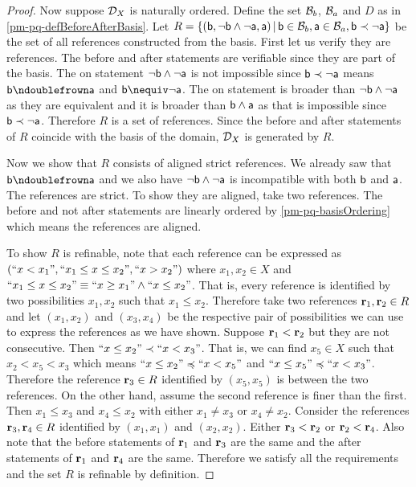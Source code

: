 \begin{mathSection}
\begin{proof}
		Now suppose $\edomain_X$ is naturally ordered. Define the set $\basis_b$, $\basis_a$ and $D$ as in \ref{pm-pq-defBeforeAfterBasis}. Let $R = \{ (\stmt[b], \NOT \stmt[b] \AND \NOT \stmt[a], \stmt[a]) \, | \, \stmt[b] \in \basis_b, \stmt[a] \in \basis_a, \stmt[b] \snarrower \NOT \stmt[a] \}$ be the set of all references constructed from the basis. First let us verify they are references. The before and after statements are verifiable since they are part of the basis. The on statement $\NOT \stmt[b] \AND \NOT \stmt[a]$ is not impossible since $\stmt[b] \snarrower \NOT \stmt[a]$ means $\stmt[b] \ncomp \stmt[a]$ and $\stmt[b] \nequiv \NOT \stmt[a]$. The on statement is broader than $\NOT \stmt[b] \AND \NOT \stmt[a]$ as they are equivalent and it is broader than $\stmt[b] \AND \stmt[a]$ as that is impossible since $\stmt[b] \snarrower \NOT \stmt[a]$. Therefore $R$ is a set of references. Since the before and after statements of $R$ coincide with the basis of the domain, $\edomain_X$ is generated by $R$.
		
		Now we show that $R$ consists of aligned strict references. We already saw that $\stmt[b] \ncomp \stmt[a]$ and we also have $\NOT \stmt[b] \AND \NOT \stmt[a]$ is incompatible with both $\stmt[b]$ and $\stmt[a]$. The references are strict. To show they are aligned, take two references. The before and not after statements are linearly ordered by \ref{pm-pq-basisOrdering} which means the references are aligned.
		
		To show $R$ is refinable, note that each reference can be expressed as $(``x < x_1", ``x_1 \leq x \leq x_2", ``x > x_2")$ where $x_1, x_2 \in X$ and $``x_1 \leq x \leq x_2" \equiv ``x \geq x_1" \AND ``x \leq x_2"$. That is, every reference is identified by two possibilities $x_1, x_2$ such that $x_1 \leq x_2$. Therefore take two references $\refStmt_1, \refStmt_2 \in R$ and let $(x_1, x_2)$ and $(x_3, x_4)$ be the respective pair of possibilities we can use to express the references as we have shown. Suppose $\refStmt_1 < \refStmt_2$ but they are not consecutive. Then $``x \leq x_2" \snarrower ``x < x_3"$. That is, we can find $x_5 \in X$ such that  $x_2 < x_5 < x_3$ which means $``x \leq x_2" \narrower ``x < x_5"$ and $``x \leq x_5" \narrower ``x < x_3"$. Therefore the reference $\refStmt_3 \in R$ identified by $(x_5, x_5)$ is between the two references. On the other hand, assume the second reference is finer than the first. Then $x_1 \leq x_3$ and $x_4 \leq x_2$ with either $x_1 \neq x_3$ or $x_4 \neq x_2$. Consider the references $\refStmt_3, \refStmt_4 \in R$ identified by $(x_1, x_1)$ and $(x_2, x_2)$. Either $\refStmt_3 < \refStmt_2$ or $\refStmt_2 < \refStmt_4$. Also note that the before statements of $\refStmt_1$ and $\refStmt_3$ are the same and the after statements of $\refStmt_1$ and $\refStmt_4$ are the same. Therefore we satisfy all the requirements and the set $R$ is refinable by definition.
	\end{proof}
\end{mathSection}

